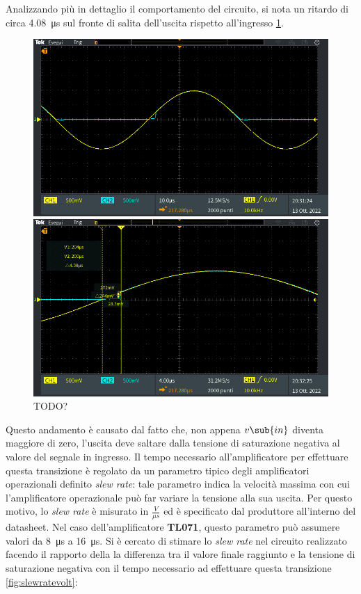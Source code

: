 Analizzando più in dettaglio il comportamento del circuito, si nota un ritardo di circa \SI{4.08}{\micro\second} sul fronte di salita dell'uscita rispetto all'ingresso \ref{fig:slewrate}.
\begin{figure}[!ht]
	\centering
	\begin{minipage}{.45\textwidth}
		\includegraphics[width=\linewidth]{./ImageFiles/Laboratorio 2/TEK00038.PNG}
	\end{minipage}\qquad
	\begin{minipage}{.45\textwidth}
		\includegraphics[width=\linewidth]{./ImageFiles/Laboratorio 2/TEK00039.PNG}
	\end{minipage}
	\caption{TODO?}
	\label{fig:slewrate}
\end{figure}
Questo andamento è causato dal fatto che, non appena $v\sub{in}$ diventa maggiore di zero, l'uscita deve saltare dalla tensione di saturazione negativa al valore del segnale in ingresso. Il tempo necessario all'amplificatore per effettuare questa transizione è regolato da un parametro tipico degli amplificatori operazionali definito \textit{slew rate}: tale parametro indica la velocità massima con cui l'amplificatore operazionale può far variare la tensione alla sua uscita. Per questo motivo, lo \textit{slew rate} è misurato in $\frac{V}{\mu s}$ ed è specificato dal produttore all'interno del datasheet. Nel caso dell'amplificatore \textbf{TL071}, questo parametro può assumere valori da \SI{8}{\micro\second} a \SI{16}{\micro\second}. Si è cercato di stimare lo \textit{slew rate} nel circuito realizzato facendo il rapporto della la differenza tra il valore finale raggiunto e la tensione di saturazione negativa con il tempo necessario ad effettuare questa transizione \ref{fig:slewratevolt}:

